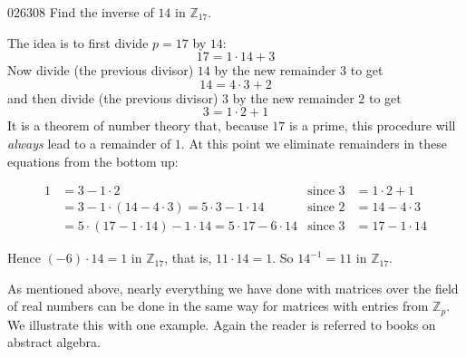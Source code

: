 \begin{example}{}{026308}
Find the inverse of $14$ in $\mathbb{Z}_{17}$.

\begin{solution}
 The idea is to first divide $p = 17$ by $14$: 
\begin{equation*}
17 = 1 \cdot 14 + 3
\end{equation*}
Now divide (the previous divisor) $14$ by the new remainder $3$ to get
\begin{equation*}
14 = 4 \cdot 3 + 2
\end{equation*}
and then divide (the previous divisor) $3$ by the new remainder $2$ to get
\begin{equation*}
3 = 1 \cdot 2 + 1
\end{equation*}
It is a theorem of number theory that, because $17$ is a prime, this procedure will \textit{always} lead to a remainder of $1$. At this point we eliminate remainders in these equations from the bottom up:

\begin{align*}
1 &= 3 - 1 \cdot 2 &\mbox{since } 3 &= 1 \cdot 2 + 1 \\
  &= 3 - 1 \cdot (14 - 4 \cdot 3) = 5 \cdot 3 - 1 \cdot 14 &\mbox{since } 2 &= 14 - 4 \cdot 3 \\
  &= 5 \cdot (17 - 1 \cdot 14) - 1 \cdot 14 = 5 \cdot 17 - 6 \cdot 14 &\mbox{since } 3 &= 17 - 1 \cdot 14
\end{align*}

Hence $(-6) \cdot 14 = 1$ in $\mathbb{Z}_{17}$, that is, $11 \cdot 14 = 1$. So $14^{-1} = 11$ in $\mathbb{Z}_{17}$.
\end{solution}
\end{example}

As mentioned above, nearly everything we have done with matrices over the field of real numbers can be done in the same way for matrices with entries from $\mathbb{Z}_p$. We illustrate this with one example. Again the reader is referred to books on abstract algebra.


